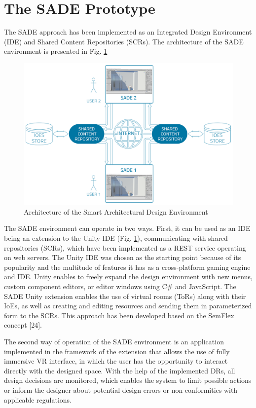 \documentclass[runningheads]{llncs}
\begin{document}
\section{The SADE Prototype}
The SADE approach has been implemented as an Integrated Design Environment (IDE) and Shared Content Repositories (SCRs). The architecture of the SADE environment is presented in Fig. \ref{fig-arch}

\begin{figure}[H]
\centering
\includegraphics[width=\textwidth]{graf2.png}
\caption{Architecture of the Smart Architectural Design Environment} \label{fig-arch}
\end{figure}

The SADE environment can operate in two ways. First, it can be used as an IDE being an extension to the Unity IDE (Fig. \ref{fig-arch}), communicating with shared repositories (SCRs), which have been implemented as a REST service operating on web servers. The Unity IDE was chosen as the starting point because of its popularity and the multitude of features it has as a cross-platform gaming engine and IDE. Unity enables to freely expand the design environment with new menus, custom component editors, or editor windows using C\# and JavaScript. The SADE Unity extension enables the use of virtual rooms (ToRs) along with their IoEs, as well as creating and editing resources and sending them in parameterized form to the SCRs. This approach has been developed based on the SemFlex concept [24].

The second way of operation of the SADE environment is an application implemented in the framework of the extension that allows the use of fully immersive VR interface, in which the user has the opportunity to interact directly with the designed space. With the help of the implemented DRs, all design decisions are monitored, which enables the system to limit possible actions or inform the designer about potential design errors or non-conformities with applicable regulations.
\end{document}
